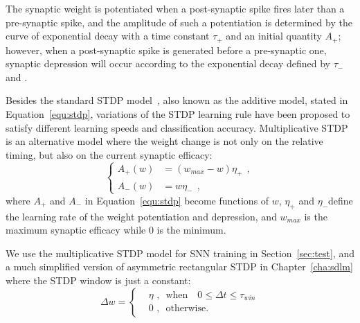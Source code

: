 The synaptic weight is potentiated when a post-synaptic spike fires later than a pre-synaptic spike, and the amplitude of such a potentiation is determined by the curve of exponential decay with a time constant $\tau_+$ and an initial quantity $A_+$;
however, when a post-synaptic spike is generated before a pre-synaptic one, synaptic depression will occur according to the exponential decay defined by $\tau_-$ and \DIFdelbegin {}\DIFdelend \DIFaddbegin {}\DIFaddend .

Besides the standard STDP model~\citep{song2000competitive}, also known as the additive model, stated in Equation~\ref{equ:stdp}, variations of the STDP learning rule have been proposed to satisfy different learning speeds and classification accuracy.
Multiplicative STDP~\citep{morrison2008phenomenological} is an alternative model where the weight change is not only \DIFdelbegin {}\DIFdelend \DIFaddbegin {}\DIFaddend on the relative timing, but also on the current synaptic efficacy:
\begin{equation}
\left\{
\begin{aligned}
A_+ (w) &=  (w_{max} - w)\eta_+~~, \\
A_- (w) &= w\eta_-~~,
\end{aligned}
\right.
\end{equation}
where $A_+$ and $A_-$ in Equation~\ref{equ:stdp} become functions of \DIFdelbegin {}\DIFdelend \DIFaddbegin {}\DIFaddend $w$, $\eta_+$ and $\eta_-$\DIFaddbegin {}\DIFaddend define the learning rate of the weight potentiation and depression, and $w_{max}$ is the maximum synaptic efficacy while 0 is the minimum.

We use the multiplicative STDP model for SNN training in Section~\ref{sec:test}, and a much simplified version of asymmetric rectangular STDP in Chapter~\ref{cha:sdlm} where the STDP window is just a constant:
\begin{equation}
\Delta w = \left\{
\begin{aligned}
&\eta \textrm{~,~~when~~~} 0 \leq \Delta  t \leq \tau_{win}\\
& 0 \textrm{~,~~otherwise}.
\end{aligned}
\right.
\end{equation}

